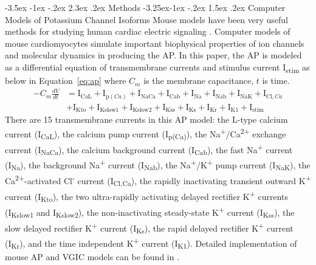 \documentclass[11pt]{article}
\makeatletter
\renewcommand\section{\@startsection {section}{1}{\z@}%
                                   {-3.5ex \@plus -1ex \@minus -.2ex}%
                                   {2.3ex \@plus.2ex}%
                                   {\normalfont\fontfamily{phv}\fontsize{16}{19}\bfseries}}
\renewcommand\subsection{\@startsection{subsection}{2}{\z@}%
                                     {-3.25ex\@plus -1ex \@minus -.2ex}%
                                     {1.5ex \@plus .2ex}%
                                     {\normalfont\fontfamily{phv}\fontsize{14}{17}\bfseries}}
\makeatother
\begin{document}
\section{Methods}
\subsection{Computer Models of Potassium Channel Isoforms}
Mouse models have been very useful methods for studying human cardiac electric signaling \citep{nerbonne2004studying,milani2014small,kim2022irx5}. Computer models of mouse cardiomyocytes simulate important biophysical properties of ion channels and molecular dynamics in producing the AP. In this paper, the AP is modeled as a differential equation of transmembrane currents and stimulus current I\textsubscript{stim} as below in Equation~\ref{eq:ap} where $C_{m}$ is the membrane capacitance, $t$ is time.
\begin{equation}
    \label{eq:ap}
    \begin{split}
    -C_{m}\frac{dV}{dt} &= \mathrm{I}_{\mathrm{CaL}}+\mathrm{I}_{\mathrm{p}(Ca)}+\mathrm{I}_{\mathrm{NaCa}}+\mathrm{I}_{\mathrm{Cab}}+\mathrm{I}_{\mathrm{Na}}+\mathrm{I}_{\mathrm{Nab}}+\mathrm{I}_{\mathrm{NaK}}+\mathrm{I}_{\mathrm{Cl},Ca} \\
    &+\mathrm{I}_{\mathrm{Kto}}+\mathrm{I}_{\mathrm{Kslow1}}+\mathrm{I}_{\mathrm{Kslow2}}+\mathrm{I}_{\mathrm{Kss}}+\mathrm{I}_{\mathrm{Ks}}+\mathrm{I}_{\mathrm{Kr}}+\mathrm{I}_{\mathrm{K1}}+\mathrm{I}_{\mathrm{stim}}
    \end{split}
\end{equation}
There are 15 transmembrane currents in this AP model: the L-type calcium current (I\textsubscript{CaL}), the calcium pump current (I\textsubscript{p(Ca)}), the Na\textsuperscript{+}/Ca\textsuperscript{2+} exchange current (I\textsubscript{NaCa}), the calcium background current (I\textsubscript{Cab}), the fast Na\textsuperscript{+} current (I\textsubscript{Na}), the background Na\textsuperscript{+} current (I\textsubscript{Nab}), the Na\textsuperscript{+}/K\textsuperscript{+} pump current (I\textsubscript{NaK}), the Ca\textsuperscript{2+}-activated Cl\textsuperscript{-} current (I\textsubscript{Cl,Ca}), the rapidly inactivating transient outward K\textsuperscript{+} current (I\textsubscript{Kto}), the two ultra-rapidly activating delayed rectifier K\textsuperscript{+} currents (I\textsubscript{Kslow1} and I\textsubscript{Kslow2}), the non-inactivating steady-state K\textsuperscript{+} current (I\textsubscript{Kss}), the slow delayed rectifier K\textsuperscript{+} current (I\textsubscript{Ks}), the rapid delayed rectifier K\textsuperscript{+} current (I\textsubscript{Kr}), and the time independent K\textsuperscript{+} current (I\textsubscript{K1}). Detailed implementation of mouse AP and VGIC models can be found in \cite{bondarenko2014compartmentalized,asfaw2020compartmentalized}.
\end{document}
